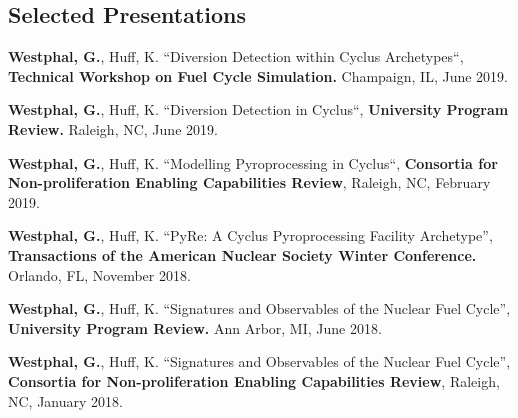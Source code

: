 \documentclass[margin,line]{resume}
\begin{document}
\begin{resume}
    \section{\mysidestyle Selected Presentations}
    \begin{bibenum} 
    \item \textbf{Westphal, G.}, Huff, K. ``Diversion Detection within Cyclus Archetypes``,
    		\textbf{Technical Workshop on Fuel Cycle Simulation.}
    		Champaign, IL, June 2019.
    \item \textbf{Westphal, G.}, Huff, K. ``Diversion Detection in Cyclus``,
    		\textbf{University Program Review.}
    		Raleigh, NC, June 2019.
    \item \textbf{Westphal, G.}, Huff, K. ``Modelling Pyroprocessing in Cyclus``,
    		\textbf{Consortia for Non-proliferation Enabling Capabilities Review},
    		Raleigh, NC, February 2019.
    \item \textbf{Westphal, G.}, Huff, K. ``PyRe: A Cyclus Pyroprocessing Facility Archetype'', 
            \textbf{Transactions of the American Nuclear Society Winter Conference.} 
            Orlando, FL, November 2018.  
    \item \textbf{Westphal, G.}, Huff, K. ``Signatures and Observables of the Nuclear Fuel Cycle'', 
            \textbf{University Program Review.} 
            Ann Arbor, MI, June 2018.
    \item \textbf{Westphal, G.}, Huff, K. ``Signatures and Observables of the Nuclear Fuel Cycle'', 
    		\textbf{Consortia for Non-proliferation Enabling Capabilities Review}, 
    		Raleigh, NC, January 2018.
    \end{bibenum}
               

\end{resume}
\end{document}
